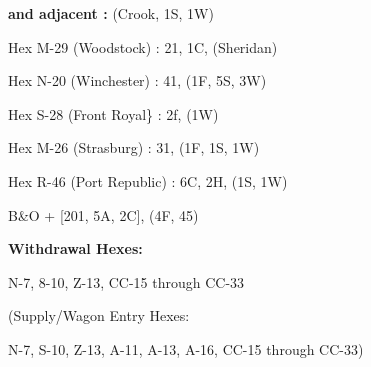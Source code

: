 \begin{scenariodata}
\textbf{and adjacent :} (Crook, 1S, 1W)\\
\end{scenariodata}

\begin{scenariodata}
Hex M-29 (Woodstock) : 21, 1C, (Sheridan)\\
\end{scenariodata}

\begin{scenariodata}
Hex N-20 (Winchester) : 41, (1F, 5S, 3W)\\
\end{scenariodata}

\begin{scenariodata}
Hex S-28 (Front Royal\} : 2f, (1W)\\
\end{scenariodata}

\begin{scenariodata}
Hex M-26 (Strasburg) : 31, (1F, 1S, 1W)\\
\end{scenariodata}

\begin{scenariodata}
Hex R-46 (Port Republic) : 6C, 2H, (1S, 1W)\\
\end{scenariodata}

\begin{scenariodata}
B\&O + [201, 5A, 2C], (4F, 45)\\
\end{scenariodata}

\begin{scenariodata}
\textbf{Withdrawal Hexes:}\\
\end{scenariodata}

\begin{scenariodata}
N-7, 8-10, Z-13, CC-15 through CC-33\\
\end{scenariodata}

\begin{scenariodata}
(Supply/Wagon Entry Hexes:\\
\end{scenariodata}

\begin{scenariodata}
N-7, S-10, Z-13, A-11, A-13, A-16, CC-15 through CC-33)\\
\end{scenariodata}

